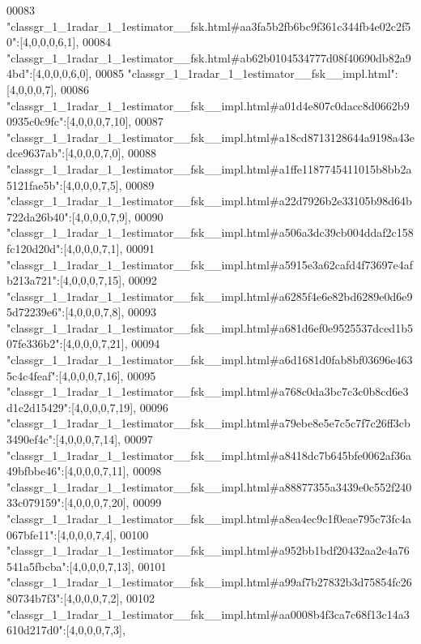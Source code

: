 \begin{DoxyCode}
00083 \textcolor{stringliteral}{"classgr\_1\_1radar\_1\_1estimator\_\_fsk.html#aa3fa5b2fb6bc9f361c344fb4e02c2f50"}:[4,0,0,0,6,1],
00084 \textcolor{stringliteral}{"classgr\_1\_1radar\_1\_1estimator\_\_fsk.html#ab62b0104534777d08f40690db82a94bd"}:[4,0,0,0,6,0],
00085 \textcolor{stringliteral}{"classgr\_1\_1radar\_1\_1estimator\_\_fsk\_\_impl.html"}:[4,0,0,0,7],
00086 \textcolor{stringliteral}{"classgr\_1\_1radar\_1\_1estimator\_\_fsk\_\_impl.html#a01d4e807c0dacc8d0662b90935c0c9fc"}:[4,0,0,0,7,10],
00087 \textcolor{stringliteral}{"classgr\_1\_1radar\_1\_1estimator\_\_fsk\_\_impl.html#a18cd8713128644a9198a43edce9637ab"}:[4,0,0,0,7,0],
00088 \textcolor{stringliteral}{"classgr\_1\_1radar\_1\_1estimator\_\_fsk\_\_impl.html#a1ffe1187745411015b8bb2a5121fae5b"}:[4,0,0,0,7,5],
00089 \textcolor{stringliteral}{"classgr\_1\_1radar\_1\_1estimator\_\_fsk\_\_impl.html#a22d7926b2e33105b98d64b722da26b40"}:[4,0,0,0,7,9],
00090 \textcolor{stringliteral}{"classgr\_1\_1radar\_1\_1estimator\_\_fsk\_\_impl.html#a506a3dc39cb004ddaf2c158fc120d20d"}:[4,0,0,0,7,1],
00091 \textcolor{stringliteral}{"classgr\_1\_1radar\_1\_1estimator\_\_fsk\_\_impl.html#a5915e3a62cafd4f73697e4afb213a721"}:[4,0,0,0,7,15],
00092 \textcolor{stringliteral}{"classgr\_1\_1radar\_1\_1estimator\_\_fsk\_\_impl.html#a6285f4e6e82bd6289e0d6e95d72239e6"}:[4,0,0,0,7,8],
00093 \textcolor{stringliteral}{"classgr\_1\_1radar\_1\_1estimator\_\_fsk\_\_impl.html#a681d6ef0e9525537dced1b507fe336b2"}:[4,0,0,0,7,21],
00094 \textcolor{stringliteral}{"classgr\_1\_1radar\_1\_1estimator\_\_fsk\_\_impl.html#a6d1681d0fab8bf03696e4635c4c4feaf"}:[4,0,0,0,7,16],
00095 \textcolor{stringliteral}{"classgr\_1\_1radar\_1\_1estimator\_\_fsk\_\_impl.html#a768c0da3bc7c3c0b8cd6e3d1c2d15429"}:[4,0,0,0,7,19],
00096 \textcolor{stringliteral}{"classgr\_1\_1radar\_1\_1estimator\_\_fsk\_\_impl.html#a79ebe8e5e7c5c7f7c26ff3cb3490ef4c"}:[4,0,0,0,7,14],
00097 \textcolor{stringliteral}{"classgr\_1\_1radar\_1\_1estimator\_\_fsk\_\_impl.html#a8418dc7b645bfe0062af36a49bfbbe46"}:[4,0,0,0,7,11],
00098 \textcolor{stringliteral}{"classgr\_1\_1radar\_1\_1estimator\_\_fsk\_\_impl.html#a88877355a3439e0c552f24033c079159"}:[4,0,0,0,7,20],
00099 \textcolor{stringliteral}{"classgr\_1\_1radar\_1\_1estimator\_\_fsk\_\_impl.html#a8ea4ec9c1f0eae795c73fc4a067bfe11"}:[4,0,0,0,7,4],
00100 \textcolor{stringliteral}{"classgr\_1\_1radar\_1\_1estimator\_\_fsk\_\_impl.html#a952bb1bdf20432aa2e4a76541a5fbcba"}:[4,0,0,0,7,13],
00101 \textcolor{stringliteral}{"classgr\_1\_1radar\_1\_1estimator\_\_fsk\_\_impl.html#a99af7b27832b3d75854fc2680734b7f3"}:[4,0,0,0,7,2],
00102 \textcolor{stringliteral}{"classgr\_1\_1radar\_1\_1estimator\_\_fsk\_\_impl.html#aa0008b4f3ca7c68f13c14a3610d217d0"}:[4,0,0,0,7,3],

\end{DoxyCode}
